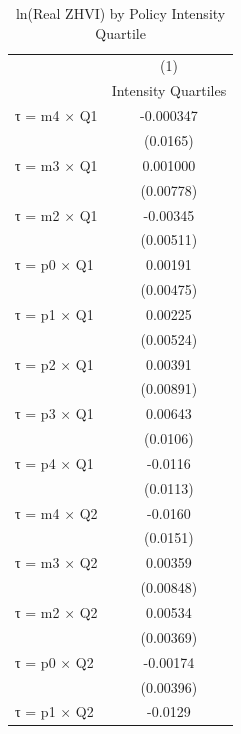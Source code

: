 \begin{table}[htbp]\centering
\def\sym#1{\ifmmode^{#1}\else\(^{#1}\)\fi}
\caption{ln(Real ZHVI) by Policy Intensity Quartile}
\begin{tabular}{l*{1}{c}}
\hline\hline
                    &\multicolumn{1}{c}{(1)}\\
                    &\multicolumn{1}{c}{Intensity Quartiles}\\
\hline
τ = m4 × Q1         &   -0.000347         \\
                    &    (0.0165)         \\
[1em]
τ = m3 × Q1         &    0.001000         \\
                    &   (0.00778)         \\
[1em]
τ = m2 × Q1         &    -0.00345         \\
                    &   (0.00511)         \\
[1em]
τ = p0 × Q1         &     0.00191         \\
                    &   (0.00475)         \\
[1em]
τ = p1 × Q1         &     0.00225         \\
                    &   (0.00524)         \\
[1em]
τ = p2 × Q1         &     0.00391         \\
                    &   (0.00891)         \\
[1em]
τ = p3 × Q1         &     0.00643         \\
                    &    (0.0106)         \\
[1em]
τ = p4 × Q1         &     -0.0116         \\
                    &    (0.0113)         \\
[1em]
τ = m4 × Q2         &     -0.0160         \\
                    &    (0.0151)         \\
[1em]
τ = m3 × Q2         &     0.00359         \\
                    &   (0.00848)         \\
[1em]
τ = m2 × Q2         &     0.00534         \\
                    &   (0.00369)         \\
[1em]
τ = p0 × Q2         &    -0.00174         \\
                    &   (0.00396)         \\
[1em]
τ = p1 × Q2         &     -0.0129         \\

\end{tabular}
\end{table}
